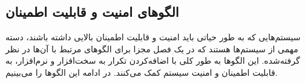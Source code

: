 \subsection{الگوهای امنیت و قابلیت اطمینان}
\begin{RTL}
سیستم‌هایی که به طور حیاتی باید امنیت و قابلیت اطمینان بالایی داشته باشند،
دسته مهمی از سیستم‌ها هستند که در \cite{ref1} یک فصل مجزا
برای الگوهای مرتبط با آن‌ها در نظر گرفته‌شده. این الگوها
به طور کلی با اضافه‌کردن تکرار به سخت‌افزار و نرم‌افزار، به قابلیت اطمینان
و امنیت سیستم کمک می‌کنند. در ادامه این الگوها را می‌بینیم.
\end{RTL}





